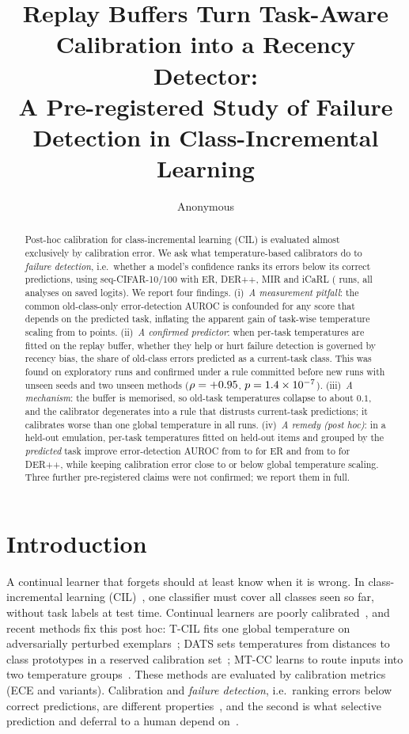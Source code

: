 \documentclass[11pt]{article}
\title{Replay Buffers Turn Task-Aware Calibration into a Recency Detector:\\
A Pre-registered Study of Failure Detection in Class-Incremental Learning}
\author{Anonymous}
\date{}
\begin{document}
\maketitle

\begin{abstract}
Post-hoc calibration for class-incremental learning (CIL) is evaluated almost exclusively by
calibration error. We ask what temperature-based calibrators do to \emph{failure detection}, i.e.\
whether a model's confidence ranks its errors below its correct predictions, using seq-CIFAR-10/100
with ER, DER++, MIR and iCaRL (\nTotal{} runs, all analyses on saved logits). We report four
findings. (i)~\emph{A measurement pitfall}: the common old-class-only error-detection AUROC is
confounded for any score that depends on the predicted task, inflating the apparent gain of
task-wise temperature scaling from \confoundAll{} to \confoundOld{} points. (ii)~\emph{A confirmed
predictor}: when per-task temperatures are fitted on the replay buffer, whether they help or hurt
failure detection is governed by recency bias, the share of old-class errors predicted as a
current-task class. This was found on \nExplore{} exploratory runs and confirmed under a rule
committed before \nConfirm{} new runs with unseen seeds and two unseen methods
($\rho=+0.95$, $p=1.4\times10^{-7}$). (iii)~\emph{A mechanism}: the buffer is memorised, so
old-task temperatures collapse to about $0.1$, and the calibrator degenerates into a rule that
distrusts current-task predictions; it calibrates worse than one global temperature in all
\nTotal{} runs. (iv)~\emph{A remedy (post hoc)}: in a held-out emulation, per-task temperatures
fitted on held-out items and grouped by the \emph{predicted} task improve error-detection AUROC
from \heldERmsp{} to \heldERpred{} for ER and from \heldDmsp{} to \heldDpred{} for DER++, while
keeping calibration error close to or below global temperature scaling. Three further
pre-registered claims were not confirmed; we report them in full.
\end{abstract}

\section{Introduction}
A continual learner that forgets should at least know when it is wrong. In class-incremental
learning (CIL)~\cite{vandeven2022three,masana2022survey}, one classifier must cover all classes seen
so far, without task labels at test time. Continual learners are poorly
calibrated~\cite{li2024calibration}, and recent methods fix this post hoc: T-CIL fits one global
temperature on adversarially perturbed exemplars~\cite{hwang2025tcil}; DATS sets temperatures from
distances to class prototypes in a reserved calibration set~\cite{dats2025}; MT-CC learns to route
inputs into two temperature groups~\cite{mtcc2026}. These methods are evaluated by calibration
metrics (ECE and variants). Calibration and \emph{failure detection}, i.e.\ ranking errors below
correct predictions, are different properties~\cite{jaeger2023call,zhu2022rethinking}, and the
second is what selective prediction and deferral to a human depend on~\cite{geifman2017selective}.
\end{document}
